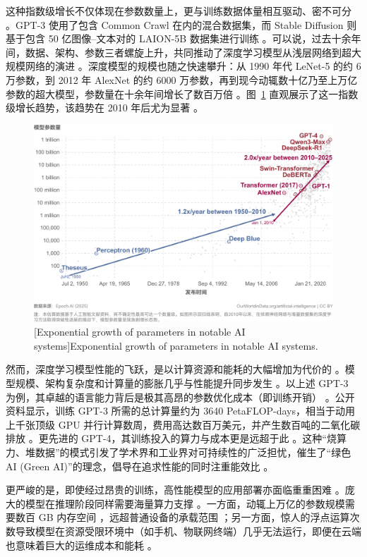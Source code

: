 \documentclass[../main.tex]{subfiles}
\begin{document}
这种指数级增长不仅体现在参数数量上，更与训练数据体量相互驱动、密不可分 。GPT-3 使用了包含 Common Crawl 在内的混合数据集，而 Stable Diffusion 则基于包含 50 亿图像–文本对的 LAION-5B 数据集进行训练 。可以说，过去十余年间，数据、架构、参数三者螺旋上升，共同推动了深度学习模型从浅层网络到超大规模网络的演进 。深度模型的规模也随之快速攀升：从 1990 年代 LeNet-5 的约 6 万参数，到 2012 年 AlexNet 的约 6000 万参数，再到现今动辄数十亿乃至上万亿参数的超大模型，参数量在十余年间增长了数百万倍 。图~\ref{fig:Ch1-1_model_parameter_evolve} 直观展示了这一指数级增长趋势，该趋势在 2010 年后尤为显著 。

\begin{figure}
	\centering
	\includegraphics[width=.85\textwidth]{Ch1-1_model_parameter_evolve.pdf}
	[Exponential growth of parameters in notable AI systems]{Exponential growth of parameters in notable AI systems.}
	\label{fig:Ch1-1_model_parameter_evolve}
\end{figure}

然而，深度学习模型性能的飞跃，是以计算资源和能耗的大幅增加为代价的 。模型规模、架构复杂度和计算量的膨胀几乎与性能提升同步发生 。以上述 GPT-3 为例，其卓越的语言能力背后是极其高昂的参数优化成本（即训练开销） 。公开资料显示，训练 GPT-3 所需的总计算量约为 3640 PetaFLOP-days，相当于动用上千张顶级 GPU 并行计算数周，费用高达数百万美元，并产生数百吨的二氧化碳排放 。更先进的 GPT-4，其训练投入的算力与成本更是远超于此 。这种“烧算力、堆数据”的模式引发了学术界和工业界对可持续性的广泛担忧，催生了“绿色 AI (Green AI)”的理念，倡导在追求性能的同时注重能效比 。

更严峻的是，即使经过昂贵的训练，高性能模型的应用部署亦面临重重困难 。庞大的模型在推理阶段同样需要海量算力支撑 。一方面，动辄上万亿的参数规模需要数百 GB 内存空间 ，远超普通设备的承载范围 ；另一方面，惊人的浮点运算次数导致模型在资源受限环境中（如手机、物联网终端）几乎无法运行，即便在云端也意味着巨大的运维成本和能耗 。
\end{document}
